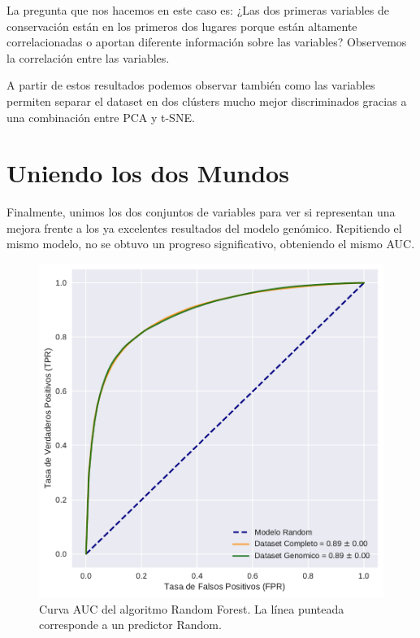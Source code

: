 La pregunta que nos hacemos en este caso es: ¿Las dos primeras variables de conservación están en los primeros dos lugares porque están altamente correlacionadas o aportan diferente información sobre las variables? Observemos la correlación entre las variables.


A partir de estos resultados podemos observar también como las variables permiten separar el dataset en dos clústers mucho mejor discriminados gracias a una combinación entre PCA y t-SNE.




\section{Uniendo los dos Mundos}

Finalmente, unimos los dos conjuntos de variables para ver si representan una mejora frente a los ya excelentes resultados del modelo genómico. Repitiendo el mismo modelo, no se obtuvo un progreso significativo, obteniendo el mismo AUC. 

\begin{figure}[H]
    \centering
    \includegraphics[scale=0.73]{documents/latex/figures/3/auc_3.pdf}
    \caption{Curva AUC del algoritmo Random Forest. La línea punteada corresponde a un predictor Random.}
    \label{fig:auc_3}
\end{figure}

